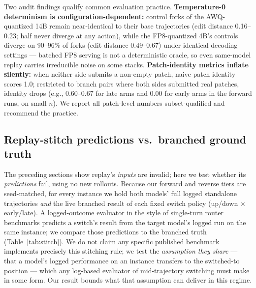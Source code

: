 \documentclass{article}
\begin{document}
Two audit findings qualify common evaluation practice. \textbf{Temperature-0 determinism is configuration-dependent:} control forks of the AWQ-quantized 14B remain near-identical to their base trajectories (edit distance 0.16--0.23; half never diverge at any action), while the FP8-quantized 4B's controls diverge on 90--96\% of forks (edit distance 0.49--0.67) under identical decoding settings --- batched FP8 serving is not a deterministic oracle, so even same-model replay carries irreducible noise on some stacks. \textbf{Patch-identity metrics inflate silently:} when neither side submits a non-empty patch, naive patch identity scores 1.0; restricted to branch pairs where both sides submitted real patches, identity drops (e.g., 0.60--0.67 for late arms and 0.00 for early arms in the forward runs, on small $n$). We report all patch-level numbers subset-qualified and recommend the practice.

\subsection{Replay-stitch predictions vs.\ branched ground truth}\label{sec:stitch}

The preceding sections show replay's \emph{inputs} are invalid; here we test whether its \emph{predictions} fail, using no new rollouts. Because our forward and reverse tiers are seed-matched, for every instance we hold both models' full logged standalone trajectories \emph{and} the live branched result of each fixed switch policy (up/down $\times$ early/late). A logged-outcome evaluator in the style of single-turn router benchmarks predicts a switch's result from the target model's logged run on the same instance; we compare those predictions to the branched truth (Table~\ref{tab:stitch}). We do not claim any specific published benchmark implements precisely this stitching rule; we test the \emph{assumption they share} --- that a model's logged performance on an instance transfers to the switched-to position --- which any log-based evaluator of mid-trajectory switching must make in some form. Our result bounds what that assumption can deliver in this regime.
\end{document}
